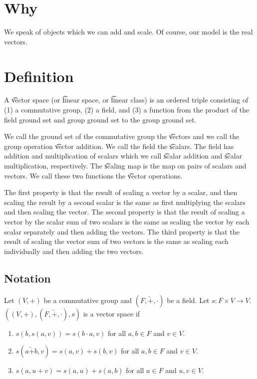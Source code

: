 

\section*{Why}

We speak of objects which we can add and scale.
Of course, our model is the real vectors.

\section*{Definition}

A \t{vector space} (or \t{linear space}, or \t{linear class}) is an ordered triple consisting of (1) a commutative group, (2) a field, and (3) a function from the product of the field ground set and group ground set to the group ground set.

We call the ground set of the commutative group the \t{vectors} and we call the group operation \t{vector addition}.
We call the field the \t{scalars}.
The field has addition and multiplication of scalars which we call \t{scalar addition} and \t{scalar multiplication}, respectively.
The \t{scaling map} is the map on pairs of scalars and vectors.
We call these two functions the \t{vector operations}.

The first property is that the result of scaling a vector by a scalar, and then scaling the result by a second scalar is the same as first multiplying the scalars and then scaling the vector.
The second property is that the result of scaling a vector by the scalar sum of two scalars is the same as scaling the vector by each scalar separately and then adding the vectors.
The third property is that the result of scaling the vector sum of two vectors is the same as scaling each individually and then adding the two vectors.

\subsection*{Notation}

Let $(V,+)$ be a commutative group and $(F, \tilde{+}, \cdot)$ be a field.
Let $s: F \times  V \to V$. $((V, +), (F, \tilde{+}, \cdot), s)$ is a vector space if
  \begin{enumerate}
    \item $s(b,s(a, v)) = s(b \cdot a, v)$ for all $a, b \in F$ and $v \in V$.
    \item $s(a\tilde{+}b, v) = s(a, v) + s(b, v)$ for all $a, b \in F$ and $v \in V$.
    \item $s(a, u + v) = s(a,u) + s(a, b)$ for all $a \in F$ and $u, v \in V$.
  \end{enumerate}

